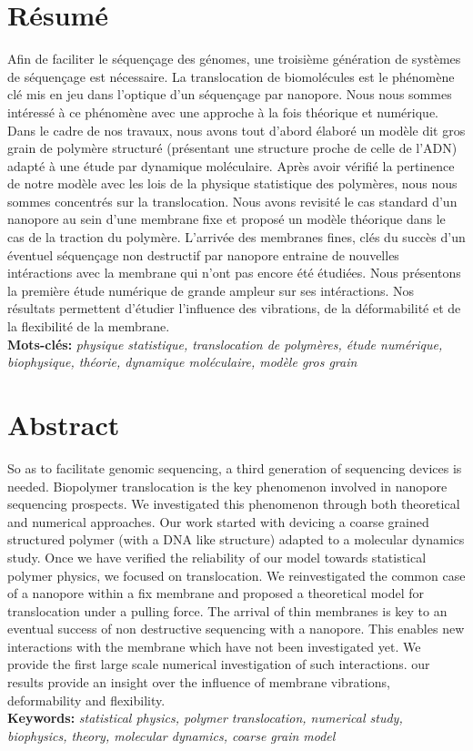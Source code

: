\thispagestyle{empty}

\newpage
\thispagestyle{empty}

\section*{Résumé}

\noindent Afin de faciliter le séquençage des génomes, une troisième génération de systèmes de séquençage est nécessaire. La translocation de biomolécules est le phénomène clé mis en jeu dans l'optique d'un séquençage par nanopore. Nous nous sommes intéressé à ce phénomène avec une approche à la fois théorique et numérique. Dans  le cadre de nos travaux, nous avons tout d'abord élaboré un modèle dit gros grain de polymère structuré (présentant une structure proche de celle de l'ADN) adapté à une étude par dynamique moléculaire. Après avoir vérifié la pertinence de notre modèle avec les lois de la physique statistique des polymères, nous nous sommes concentrés sur la translocation. Nous avons revisité le cas standard d'un nanopore au sein d'une membrane fixe et proposé un modèle théorique dans le cas de la traction du polymère. L'arrivée des membranes fines, clés du succès d'un éventuel séquençage non destructif par nanopore entraine de nouvelles intéractions avec la membrane qui n'ont pas encore été étudiées. Nous présentons la première étude numérique de grande ampleur sur ses intéractions. Nos résultats permettent d'étudier l'influence des vibrations, de la déformabilité et de la flexibilité de la membrane.\\




\noindent\textbf{Mots-clés:} \textit{physique statistique, translocation de polymères, étude numérique, biophysique, théorie, dynamique moléculaire, modèle gros grain}




\section*{Abstract}

\noindent So as to facilitate genomic sequencing, a third generation of sequencing devices is needed. Biopolymer translocation is the key phenomenon involved in nanopore sequencing prospects. We investigated this phenomenon through both theoretical and numerical approaches. Our work started with devicing a coarse grained structured polymer (with a DNA like structure) adapted to a molecular dynamics study. Once we have verified the reliability of our model towards statistical polymer physics, we focused on translocation. We reinvestigated the common case of a nanopore within a fix membrane and proposed a theoretical model for translocation under a pulling force. The arrival of thin membranes is key to an eventual success of non destructive sequencing with a nanopore. This enables new interactions with the membrane which have not been investigated yet. We provide the first large scale numerical investigation of such interactions. our results provide an insight over the influence of membrane vibrations, deformability and flexibility.\\




\noindent\textbf{Keywords:} \textit{statistical physics, polymer translocation, numerical study, biophysics, theory, molecular dynamics, coarse grain model}